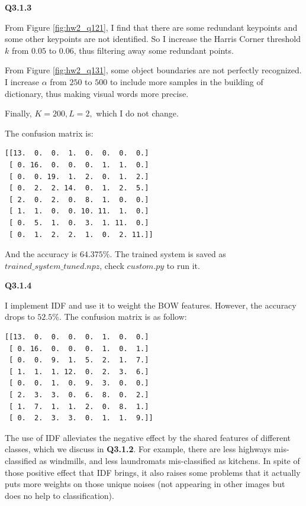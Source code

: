 \documentclass[
  course = {{16-720B Computer Vision}},
  quartile = {{1}},
  assignment = 2-Bag\ of \ Visual\ Words,
  name = {{Kangle Deng}},
  email = {{kangled@andrew.cmu.edu}},
  firstexercise = 1
]{aga-homework}
\begin{document}

\noindent \textbf{Q3.1.3}

From Figure \ref{fig:hw2_q121}, I find that there are some redundant keypoints and some other keypoints are not identified. So I increase the Harris Corner threshold $k$ from $0.05$ to $0.06$, thus filtering away some redundant points.

From Figure \ref{fig:hw2_q131}, some object boundaries are not perfectly recognized. I increase $\alpha$ from $250$ to $500$ to include more samples in the building of dictionary, thus making visual words more precise.

Finally, $K = 200, L = 2,$ which I do not change.

The confusion matrix is:
\begin{verbatim}
[[13.  0.  0.  1.  0.  0.  0.  0.]
 [ 0. 16.  0.  0.  0.  1.  1.  0.]
 [ 0.  0. 19.  1.  2.  0.  1.  2.]
 [ 0.  2.  2. 14.  0.  1.  2.  5.]
 [ 2.  0.  2.  0.  8.  1.  0.  0.]
 [ 1.  1.  0.  0. 10. 11.  1.  0.]
 [ 0.  5.  1.  0.  3.  1. 11.  0.]
 [ 0.  1.  2.  2.  1.  0.  2. 11.]]
\end{verbatim}
And the accuracy is $64.375\%$. The trained system is saved as $trained\_system\_tuned.npz$, check $custom.py$ to run it.

\noindent \textbf{Q3.1.4}

I implement IDF and use it to weight the BOW features. However, the accuracy drops to $52.5\%$. The confusion matrix is as follow:

\begin{verbatim}
[[13.  0.  0.  0.  0.  1.  0.  0.]
 [ 0. 16.  0.  0.  0.  1.  0.  1.]
 [ 0.  0.  9.  1.  5.  2.  1.  7.]
 [ 1.  1.  1. 12.  0.  2.  3.  6.]
 [ 0.  0.  1.  0.  9.  3.  0.  0.]
 [ 2.  3.  3.  0.  6.  8.  0.  2.]
 [ 1.  7.  1.  1.  2.  0.  8.  1.]
 [ 0.  2.  3.  3.  0.  1.  1.  9.]]
\end{verbatim}

The use of IDF alleviates the negative effect by the shared features of different classes, which we discuss in \textbf{Q3.1.2}. For example, there are less highways mis-classified as windmills, and less laundromats mis-classified as kitchens. In spite of those positive effect that IDF brings, it also raises some problems that it actually puts more weights on those unique noises (not appearing in other images but does no help to classification).
\end{document}
